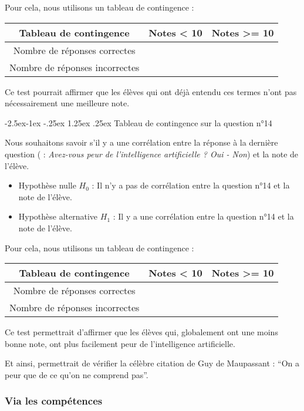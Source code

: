 \documentclass[
12pt,
french,
]{article}
\makeatletter
\renewcommand\paragraph{\@startsection{paragraph}{4}{\z@}%
        {-2.5ex\@plus -1ex \@minus -.25ex}%
        {1.25ex \@plus .25ex}%
        {\normalfont\normalsize\bfseries}}
\makeatother
\begin{document}
Pour cela, nous utilisons un tableau de contingence :

\begin{tabular}{|c|c|c|}
\hline
Tableau de contingence&Notes < 10&Notes >= 10\\
\hline
Nombre de réponses correctes& & \\
\hline
Nombre de réponses incorrectes& & \\
\hline
\end{tabular}

Ce test pourrait affirmer que les élèves qui ont déjà entendu ces termes
n'ont pas nécessairement une meilleure note.

\hypertarget{tableau-de-contingence-sur-la-question-n14}{%
\paragraph{Tableau de contingence sur la question
n°14}\label{tableau-de-contingence-sur-la-question-n14}}

Nous souhaitons savoir s'il y a une corrélation entre la réponse à la
dernière question ( : \emph{Avez-vous peur de l'intelligence
artificielle ? Oui - Non}) et la note de l'élève.

\begin{itemize}
\item
  Hypothèse nulle \(H_0\) : Il n'y a pas de corrélation entre la
  question n°14 et la note de l'élève.
\item
  Hypothèse alternative \(H_1\) : Il y a une corrélation entre la
  question n°14 et la note de l'élève.
\end{itemize}

Pour cela, nous utilisons un tableau de contingence :

\begin{tabular}{|c|c|c|}
\hline
Tableau de contingence&Notes < 10&Notes >= 10\\
\hline
Nombre de réponses correctes& & \\
\hline
Nombre de réponses incorrectes& & \\
\hline
\end{tabular}

Ce test permettrait d'affirmer que les élèves qui, globalement ont une
moins bonne note, ont plus facilement peur de l'intelligence
artificielle.

Et ainsi, permettrait de vérifier la célèbre citation de Guy de
Maupassant : ``On a peur que de ce qu'on ne comprend pas''.

\hypertarget{via-les-compuxe9tences}{%
\subsubsection{Via les compétences}\label{via-les-compuxe9tences}}
\end{document}

